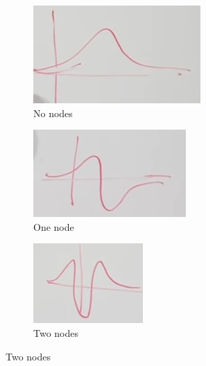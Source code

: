 \documentclass[]{article}
\newcommand{\Schr}{{Schr\"odinger }}
\begin{document}
\begin{figure}[H]
	\caption{Solving Central Potential \Schr Equation (\ref{eq:schroedinger:central})}
	\begin{subfigure}[t]{0.30\textwidth}
		\caption{No nodes}\label{fig:aqm-3-central-0node}
		\includegraphics[width=\textwidth]{aqm-3-central-0node}
	\end{subfigure}
	\quad
	\begin{subfigure}[t]{0.30\textwidth}
		\caption{One node}\label{fig:aqm-3-central-1node}
		\includegraphics[width=\textwidth]{aqm-3-central-1node}
	\end{subfigure}
	\quad
	\begin{subfigure}[t]{0.30\textwidth}
		\caption{Two nodes}\label{fig:aqm-3-central-2nodes}
		\includegraphics[width=\textwidth]{aqm-3-central-2node2}
	\end{subfigure}
\end{figure}
\end{document}
